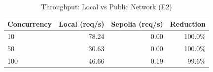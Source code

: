 \begin{table}[h]
\centering
\caption{Throughput: Local vs Public Network (E2)}
\label{tab:e2-throughput}
\begin{tabular}{lrrr}
\toprule
\textbf{Concurrency} & \textbf{Local (req/s)} & \textbf{Sepolia (req/s)} & \textbf{Reduction} \\
\midrule
10 & 78.24 & 0.00 & 100.0\% \\
50 & 30.63 & 0.00 & 100.0\% \\
100 & 46.66 & 0.19 & 99.6\% \\
\bottomrule
\end{tabular}
\end{table}
